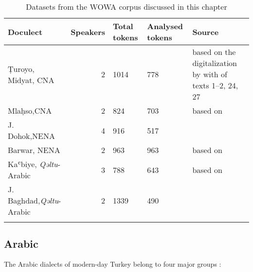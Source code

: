 \documentclass[output=paper,colorlinks,citecolor=brown,draftmode]{langscibook}
\begin{document}
\begin{table}
    \begin{tabularx}{\textwidth}{p{2.2cm}rR{1.5cm}R{1.8cm}Q}
\lsptoprule
\textbf{Doculect} & \textbf{Speakers} & \textbf{Total tokens} & \textbf{Analysed tokens} & \textbf{Source} \\
\midrule
Ṭuroyo, Midyat, CNA & 2 & 1014 & 778 & \citet{Noorlander2022Turoyo} based on the digitalization by with \citet{LyavdanskyEtAl2020Turoyo} of  texts 1--2, 24, 27 \\
\tablevspace
Mlaḥso,\newline CNA & 2 & 824 & 703 & \citet{Noorlander2022Mlahso} based on \citet[74--129]{Jastrow1994Mlahso} \\
\tablevspace
J. Dohok,\newline NENA & 4 & 916 & 517 & \citet{Molin2022NEDohok} \\
\tablevspace
Barwar, NENA & 2 & 963 & 963 & \citet{Stilo2022WOWACBarwar} based on \citet{Khan2008JUrmi} \\
\tablevspace
Kaʿbiye, \textit{Qəltu}-Arabic & 3 & 788 & 643 & \citet{Noorlander2022Arabic} based on \citet[Texts II, IX, XII, XIV]{Jastrow2022CADiyarbakir} \\
\tablevspace
J. Baghdad,\newline  \textit{Qəltu}-Arabic & 2 & 1339 & 490 & \citet{BarMosheCraevschi2022Arabic} \\
\lspbottomrule
    \end{tabularx}
    \caption{Datasets from the WOWA corpus discussed in this chapter}
    \label{Arabic:tab:1}
\end{table}

\subsection{Arabic}

The Arabic dialects of modern-day Turkey belong to four major groups \citep{Jastrow2006ATurkey}:
\end{document}
